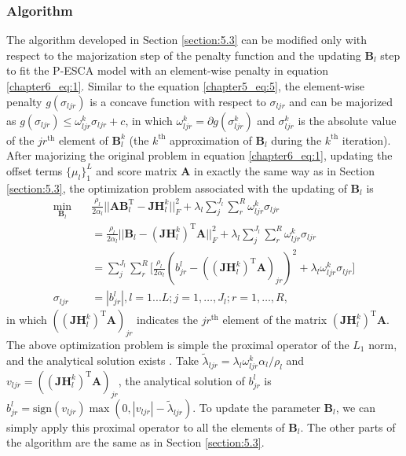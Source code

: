 \subsubsection{Algorithm}
The algorithm developed in Section \ref{section:5.3} can be modified only with respect to the majorization step of the penalty function and the updating $\mathbf{B}_l$ step to fit the P-ESCA model with an element-wise penalty in equation \ref{chapter6_eq:1}. Similar to the equation \ref{chapter5_eq:5}, the element-wise penalty $g(\sigma_{ljr})$ is a concave function with respect to $\sigma_{ljr}$ and can be majorized as $g(\sigma_{ljr}) \leq \omega_{ljr}^k \sigma_{ljr} + c$, in which $\omega_{ljr}^k = \partial g(\sigma_{ljr}^k)$ and $\sigma_{ljr}^k$ is the absolute value of the $jr^{\text{th}}$ element of $\mathbf{B}_l^k$ (the $k^{\text{th}}$ approximation of $\mathbf{B}_l$ during the $k^{\text{th}}$ iteration). After majorizing the original problem in equation \ref{chapter6_eq:1}, updating the offset terms $\{\mu_l \}_1^L$ and score matrix $\mathbf{A}$ in exactly the same way as in Section \ref{section:5.3}, the optimization problem associated with the updating of $\mathbf{B}_l$ is
\begin{equation*}
\begin{aligned}
    \min_{\mathbf{B}_l} \quad & \frac{\rho_l}{2\alpha_l} ||\mathbf{AB}_l^{\text{T}} - \mathbf{JH}_{l}^{k}||_F^2  + \lambda_l \sum_{j}^{J_l}\sum_{r}^{R} \omega_{ljr}^k \sigma_{ljr} \\
	&= \frac{\rho_l}{2\alpha_l}||\mathbf{B}_l - (\mathbf{JH}_{l}^{k})^{\text{T}} \mathbf{A}||_F^2 + \lambda_l \sum_{j}^{J_l}\sum_{r}^{R} \omega_{ljr}^k \sigma_{ljr}\\
    &= \sum_{j}^{J_l} \sum_{r}^R \Big[ \frac{\rho_l}{2\alpha_l}(b_{jr}^l - ((\mathbf{JH}_{l}^{k})^{\text{T}} \mathbf{A})_{jr})^2 + \lambda_l \omega_{ljr}^k \sigma_{ljr} \Big]\\
    \sigma_{ljr} &= |b_{jr}^{l}|, l = 1...L; j=1,\dots,J_l; r = 1,\ldots, R,
\end{aligned}
\end{equation*}
in which $((\mathbf{JH}_{l}^{k})^{\text{T}} \mathbf{A})_{jr}$ indicates the $jr^{\text{th}}$ element of the matrix $(\mathbf{JH}_{l}^{k})^{\text{T}} \mathbf{A}$. The above optimization problem is simple the proximal operator of the $L_1$ norm, and the analytical solution exists \cite{parikh2014proximal}. Take $\tilde{\lambda}_{ljr} = \lambda_l \omega_{ljr}^k \alpha_l/\rho_l$ and $v_{ljr} = ((\mathbf{JH}_{l}^{k})^{\text{T}} \mathbf{A})_{jr}$, the analytical solution of $b_{jr}^{l}$ is $b_{jr}^{l} = \text{sign}(v_{ljr}) \max(0, |v_{ljr}| -\tilde{\lambda}_{ljr})$. To update the parameter $\mathbf{B}_l$, we can simply apply this proximal operator to all the elements of $\mathbf{B}_l$. The other parts of the algorithm are the same as in Section \ref{section:5.3}.

